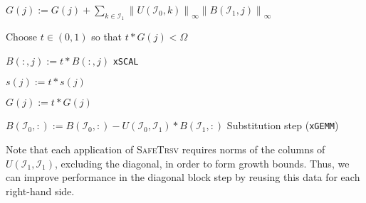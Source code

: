 \documentclass{article}
\begin{document}
\begin{algorithm}[H]
\begin{algorithmic}
    \EndFor


    \State \(G(j) := G(j) + \sum_{k\in \mathcal{I}_1} \left\lVert U(\mathcal{I}_0,k) \right\rVert_{\infty} \left\lVert B(\mathcal{I}_1,j) \right\rVert_\infty \)


    \State Choose \(t\in\left(0,1\right)\) so that \(t * G(j) < \Omega\)

    \State \(B(:,j) := t * B(:,j)\) \Comment \texttt{xSCAL}

    \State \(s(j) := t* s(j)\)

    \State \(G(j) := t * G(j)\)    

    \EndIf

    \EndFor

    \State \( B(\mathcal{I}_0,:) := B(\mathcal{I}_0,:) - U(\mathcal{I}_0,\mathcal{I}_1) * B(\mathcal{I}_1,:) \)
    \Comment Substitution step (\texttt{xGEMM})

    \EndFor

    \EndProcedure
  \end{algorithmic}
\end{algorithm}
\noindent
Note that each application of \textsc{SafeTrsv} requires norms of the
columns of \(U(\mathcal{I}_1,\mathcal{I}_1)\), excluding the diagonal,
in order to form growth bounds. Thus, we can improve performance in
the diagonal block step by reusing this data for each right-hand side.
\end{document}
